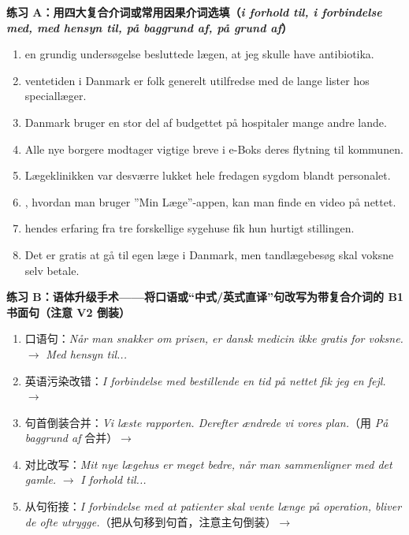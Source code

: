 \textbf{练习 A：用四大复合介词或常用因果介词选填（\textit{i forhold til, i forbindelse med, med hensyn til, på baggrund af, på grund af}）}
\begin{enumerate}
  \item \underline{\hspace{3.2cm}} en grundig undersøgelse besluttede lægen, at jeg skulle have antibiotika.
  \item \underline{\hspace{3.2cm}} ventetiden i Danmark er folk generelt utilfredse med de lange lister hos speciallæger.
  \item Danmark bruger en stor del af budgettet på hospitaler \underline{\hspace{3.2cm}} mange andre lande.
  \item Alle nye borgere modtager vigtige breve i e-Boks \underline{\hspace{3.2cm}} deres flytning til kommunen.
  \item Lægeklinikken var desværre lukket hele fredagen \underline{\hspace{3.2cm}} sygdom blandt personalet.
  \item \underline{\hspace{3.2cm}}, hvordan man bruger ”Min Læge”-appen, kan man finde en video på nettet.
  \item \underline{\hspace{3.2cm}} hendes erfaring fra tre forskellige sygehuse fik hun hurtigt stillingen.
  \item Det er gratis at gå til egen læge i Danmark, men \underline{\hspace{3.2cm}} tandlægebesøg skal voksne selv betale.
\end{enumerate}

\textbf{练习 B：语体升级手术——将口语或“中式/英式直译”句改写为带复合介词的 B1 书面句（注意 V2 倒装）}
\begin{enumerate}
  \item 口语句：\textit{Når man snakker om prisen, er dansk medicin ikke gratis for voksne.} $\rightarrow$ \textit{Med hensyn til...}
  \item 英语污染改错：\textit{I forbindelse med bestillende en tid på nettet fik jeg en fejl.} $\rightarrow$
  \item 句首倒装合并：\textit{Vi læste rapporten. Derefter ændrede vi vores plan.}（用 \textit{På baggrund af} 合并）$\rightarrow$
  \item 对比改写：\textit{Mit nye lægehus er meget bedre, når man sammenligner med det gamle.} $\rightarrow$ \textit{I forhold til...}
  \item 从句衔接：\textit{I forbindelse med at patienter skal vente længe på operation, bliver de ofte utrygge.}（把从句移到句首，注意主句倒装）$\rightarrow$
\end{enumerate}

